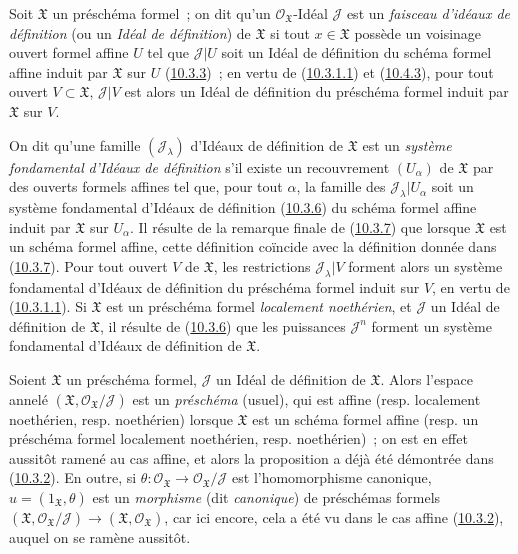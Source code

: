 \begin{env}[10.5.1]
\label{I.10.5.1-fr}
Soit $\mathfrak{X}$ un préschéma formel~; on dit qu'un
$\mathscr{O}_{\mathfrak{X}}$-Idéal $\mathscr{J}$ est un
\emph{faisceau d'idéaux de définition} (ou un
\emph{Idéal de définition}) de $\mathfrak{X}$ si tout
$x\in\mathfrak{X}$ possède un voisinage ouvert formel affine $U$ tel que
$\mathscr{J}|U$ soit un Idéal de définition du schéma formel affine
induit par $\mathfrak{X}$ sur $U$
(\hyperref[I.10.3.3-fr]{10.3.3})~; en vertu de
(\hyperref[I.10.3.1.1-fr]{10.3.1.1}) et
(\hyperref[I.10.4.3-fr]{10.4.3}), pour tout ouvert
$V\subset\mathfrak{X}$, $\mathscr{J}|V$ est alors un Idéal de définition
du préschéma formel induit par $\mathfrak{X}$ sur $V$.

On dit qu'une famille $(\mathscr{J}_\lambda)$ d'Idéaux de définition de
$\mathfrak{X}$ est un \emph{système fondamental}
\emph{d'Idéaux de définition} s'il existe un recouvrement
$(U_\alpha)$ de $\mathfrak{X}$ par des ouverts formels affines tel que,
pour tout $\alpha$, la famille des
$\mathscr{J}_\lambda|U_\alpha$ soit un système fondamental d'Idéaux de
définition (\hyperref[I.10.3.6-fr]{10.3.6}) du schéma formel affine
induit par $\mathfrak{X}$ sur $U_\alpha$. Il résulte de la remarque finale
de (\hyperref[I.10.3.7-fr]{10.3.7}) que lorsque $\mathfrak{X}$ est un
schéma formel affine, cette définition coïncide avec la définition donnée
dans (\hyperref[I.10.3.7-fr]{10.3.7}). Pour tout ouvert $V$ de
$\mathfrak{X}$, les restrictions $\mathscr{J}_\lambda|V$ forment alors un
système fondamental d'Idéaux de définition du préschéma formel induit sur
$V$, en vertu de (\hyperref[I.10.3.1.1-fr]{10.3.1.1}). Si
$\mathfrak{X}$ est un préschéma formel \emph{localement noethérien}, et
$\mathscr{J}$ un Idéal de définition de $\mathfrak{X}$, il résulte de
(\hyperref[I.10.3.6-fr]{10.3.6}) que les puissances $\mathscr{J}^n$
forment un système fondamental d'Idéaux de définition de $\mathfrak{X}$.
\end{env}

\begin{env}[10.5.2]
\label{I.10.5.2-fr}
Soient $\mathfrak{X}$ un préschéma formel, $\mathscr{J}$ un Idéal de
définition de $\mathfrak{X}$. Alors l'espace annelé
$(\mathfrak{X},\mathscr{O}_{\mathfrak{X}}/\mathscr{J})$ est un
\emph{préschéma} (usuel), qui est affine (resp. localement noethérien,
resp. noethérien) lorsque $\mathfrak{X}$ est un schéma formel affine
(resp. un préschéma formel localement noethérien, resp. noethérien)~; on
est en effet aussitôt ramené au cas affine, et alors la proposition a déjà
été démontrée dans (\hyperref[I.10.3.2-fr]{10.3.2}). En outre, si
$\theta:\mathscr{O}_{\mathfrak{X}}\to
\mathscr{O}_{\mathfrak{X}}/\mathscr{J}$ est l'homomorphisme canonique,
$u=(1_{\mathfrak{X}},\theta)$ est un \emph{morphisme} (dit
\emph{canonique}) de préschémas formels
$(\mathfrak{X},\mathscr{O}_{\mathfrak{X}}/\mathscr{J})\to
(\mathfrak{X},\mathscr{O}_{\mathfrak{X}})$, car ici encore, cela a été vu
dans le cas affine (\hyperref[I.10.3.2-fr]{10.3.2}), auquel on se ramène
aussitôt.
\end{env}

